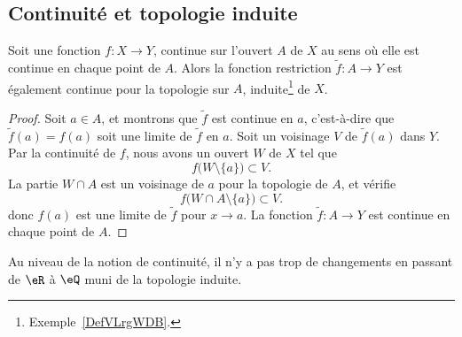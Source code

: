 \subsection{Continuité et topologie induite}
\begin{proposition}     \label{PROPooNPLBooPfmmym}
    Soit une fonction \( f\colon X\to Y\), continue sur l'ouvert \( A\) de \( X\) au sens où elle est continue en chaque point de \( A\). Alors la fonction restriction \( \tilde f\colon A\to Y\) est également continue pour la topologie sur \( A\), induite\footnote{Exemple~\ref{DefVLrgWDB}.} de \( X\).
\end{proposition}

\begin{proof}
    Soit \( a\in A\), et montrons que \( \tilde f\) est continue en \( a\), c'est-à-dire que \( \tilde f(a)=f(a)\) soit une limite de \( \tilde f\) en \( a\). Soit un voisinage \( V\) de \( \tilde f(a)\) dans \( Y\). Par la continuité de \( f\), nous avons un ouvert \( W\) de \( X\) tel que 
    \begin{equation}
        f\big( W\setminus\{ a \} \big)\subset V.
    \end{equation}
    La partie \( W\cap A\) est un voisinage de \( a\) pour la topologie de \( A\), et vérifie
    \begin{equation}
        f\big( W\cap A\setminus\{ a \} \big)\subset V.
    \end{equation}
    donc \( f(a)\) est une limite de \( \tilde f\) pour \( x\to a\). La fonction \( \tilde f\colon A\to Y\) est continue en chaque point de \( A\).
\end{proof}

Au niveau de la notion de continuité, il n'y a pas trop de changements en passant de \( \eR\) à \( \eQ\) muni de la topologie induite.

